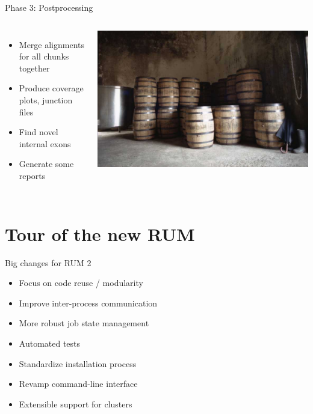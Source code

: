\documentclass{beamer}
\begin{document}
\begin{frame}{Phase 3: Postprocessing}

  \begin{columns}
    \column{2.5in}
    \begin{itemize}
    \item Merge alignments for all chunks together
    \item Produce coverage plots, junction files
    \item Find novel internal exons
    \item Generate some reports
    \end{itemize} 
    \column{2.5in}
    \includegraphics[scale=0.2]{Rum_in_barrels_at_travellers_distillery.jpg}
  \end{columns}
\end{frame}

\section{Tour of the new RUM}

\begin{frame}{Big changes for RUM 2}
  \begin{itemize}
  \item Focus on code reuse / modularity
  \item Improve inter-process communication
  \item More robust job state management
  \item Automated tests
  \item Standardize installation process
  \item Revamp command-line interface
  \item Extensible support for clusters
  \end{itemize}
\end{frame}
\end{document}
